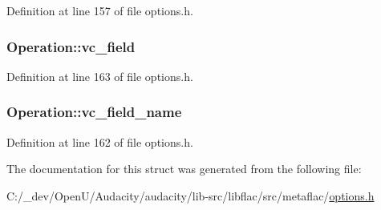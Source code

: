 Definition at line 157 of file options.\+h.

\subsubsection[{\texorpdfstring{vc\+\_\+field}{vc_field}}]{ Operation\+::vc\+\_\+field}\hypertarget{struct_operation_aa0e67833b11d5ac5f1f2e10d6256e36b}{}\label{struct_operation_aa0e67833b11d5ac5f1f2e10d6256e36b}


Definition at line 163 of file options.\+h.

\subsubsection[{\texorpdfstring{vc\+\_\+field\+\_\+name}{vc_field_name}}]{ Operation\+::vc\+\_\+field\+\_\+name}\hypertarget{struct_operation_abb88b3ad8d27c0e9c58a24e4d57f2c34}{}\label{struct_operation_abb88b3ad8d27c0e9c58a24e4d57f2c34}


Definition at line 162 of file options.\+h.



The documentation for this struct was generated from the following file\+:\begin{DoxyCompactItemize}
\item 
C\+:/\+\_\+dev/\+Open\+U/\+Audacity/audacity/lib-\/src/libflac/src/metaflac/\hyperlink{libflac_2src_2metaflac_2options_8h}{options.\+h}\end{DoxyCompactItemize}
